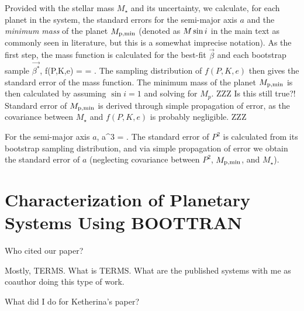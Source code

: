 Provided with the stellar mass $M_\star$ and its uncertainty, we
calculate, for each planet in the system, the standard errors for the
semi-major axis $a$ and the {\it minimum mass} of the planet $M_{\rm
  p,min}$ (denoted as $M\sin{i}$ in the main text as commonly seen in
literature, but this is a somewhat imprecise notation). As the first
step, the mass function is calculated for the best-fit $\vec{\beta}$
and each bootstrap sample $\vec{\beta^*}$,
\beq
f(P,K,e) =  = .
\eeq
The sampling distribution of $f(P,K,e)$ then gives the standard error
of the mass function. The minimum mass of the planet $M_{\rm p,min}$ 
is then calculated by assuming $\sin{i}=1$ and solving for $M_p$.
ZZZ Is this still true?! Standard error of $M_{\rm p,min}$ is derived through simple
propagation of error, as the covariance between $M_\star$ and
$f(P,K,e)$ is probably negligible. ZZZ

For the semi-major axis $a$,
\beq
a^3 =  \approx {}.
\eeq
The standard error of $P^2$ is calculated from its bootstrap sampling
distribution, and via simple propagation of error we obtain the
standard error of $a$ (neglecting covariance between $P^2$, $M_{\rm
  p,min}$, and $M_\star$).


\section{Characterization of Planetary Systems Using BOOTTRAN}

Who cited our paper?

Mostly, TERMS. What is TERMS. What are the published systems with me
as coauthor doing this type of work.

What did I do for Ketherina's paper?
